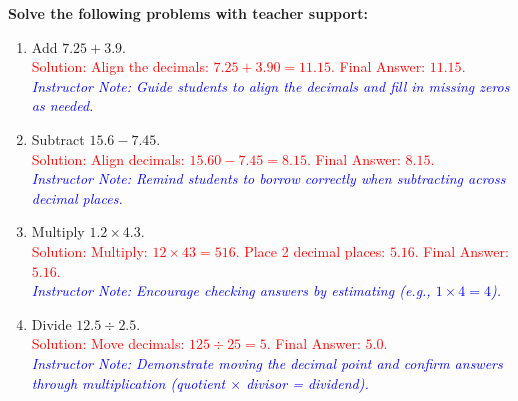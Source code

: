 \documentclass[12pt]{article}
\begin{document}
\begin{tcolorbox}[colframe=black!60, colback=white, 
coltitle=black, colbacktitle=black!15, fonttitle=\bfseries\Large, 
title=Guided Practice, halign title=center, left=10pt, right=10pt, top=10pt, bottom=15pt]
\textbf{Solve the following problems with teacher support:}
\begin{enumerate}[itemsep=5em] 
    \item Add \( 7.25 + 3.9 \). \\
    \textcolor{red}{Solution: Align the decimals: \( 7.25 + 3.90 = 11.15 \). Final Answer: \( 11.15 \).}\\
    \textcolor{blue}{\textit{Instructor Note: Guide students to align the decimals and fill in missing zeros as needed.}}

    \item Subtract \( 15.6 - 7.45 \). \\
    \textcolor{red}{Solution: Align decimals: \( 15.60 - 7.45 = 8.15 \). Final Answer: \( 8.15 \).}\\
    \textcolor{blue}{\textit{Instructor Note: Remind students to borrow correctly when subtracting across decimal places.}}

    \item Multiply \( 1.2 \times 4.3 \). \\
    \textcolor{red}{Solution: Multiply: \( 12 \times 43 = 516 \). Place 2 decimal places: \( 5.16 \). Final Answer: \( 5.16 \).}\\
    \textcolor{blue}{\textit{Instructor Note: Encourage checking answers by estimating (e.g., \( 1 \times 4 = 4 \)).}}

    \item Divide \( 12.5 \div 2.5 \). \\
    \textcolor{red}{Solution: Move decimals: \( 125 \div 25 = 5 \). Final Answer: \( 5.0 \).}\\
    \textcolor{blue}{\textit{Instructor Note: Demonstrate moving the decimal point and confirm answers through multiplication (quotient \( \times \) divisor = dividend).}}
\end{enumerate}
\end{tcolorbox}
\end{document}
